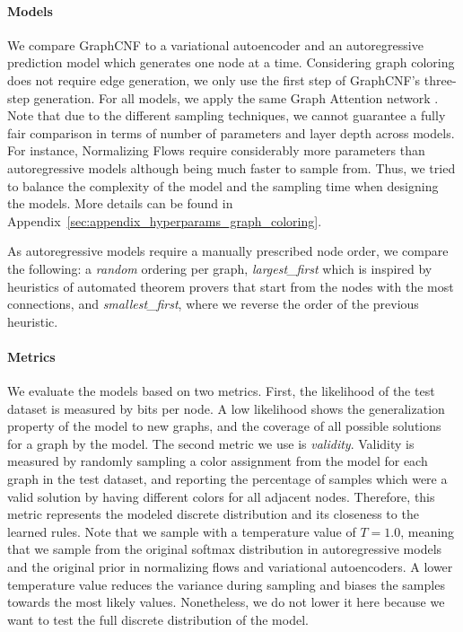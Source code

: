 \paragraph{Models} We compare GraphCNF to a variational autoencoder and an autoregressive prediction model which generates one node at a time. 
Considering graph coloring does not require edge generation, we only use the first step of GraphCNF's three-step generation. 
For all models, we apply the same Graph Attention network \cite{GraphAttentionNetwork}. 
Note that due to the different sampling techniques, we cannot guarantee a fully fair comparison in terms of number of parameters and layer depth across models.
For instance, Normalizing Flows require considerably more parameters than autoregressive models although being much faster to sample from.
Thus, we tried to balance the complexity of the model and the sampling time when designing the models. 
More details can be found in Appendix~\ref{sec:appendix_hyperparams_graph_coloring}.

As autoregressive models require a manually prescribed node order, we compare the following: a \emph{random} ordering per graph, \textit{largest\_first} which is inspired by heuristics of automated theorem provers that start from the nodes with the most connections, and \textit{smallest\_first}, where we reverse the order of the previous heuristic. 

\paragraph{Metrics} We evaluate the models based on two metrics. First, the likelihood of the test dataset is measured by bits per node. A low likelihood shows the generalization property of the model to new graphs, and the coverage of all possible solutions for a graph by the model. 
The second metric we use is \textit{validity}. 
Validity is measured by randomly sampling a color assignment from the model for each graph in the test dataset, and reporting the percentage of samples which were a valid solution by having different colors for all adjacent nodes. 
Therefore, this metric represents the modeled discrete distribution and its closeness to the learned rules. 
Note that we sample with a temperature value of $T=1.0$, meaning that we sample from the original softmax distribution in autoregressive models and the original prior in normalizing flows and variational autoencoders. 
A lower temperature value reduces the variance during sampling and biases the samples towards the most likely values.
Nonetheless, we do not lower it here because we want to test the full discrete distribution of the model.

